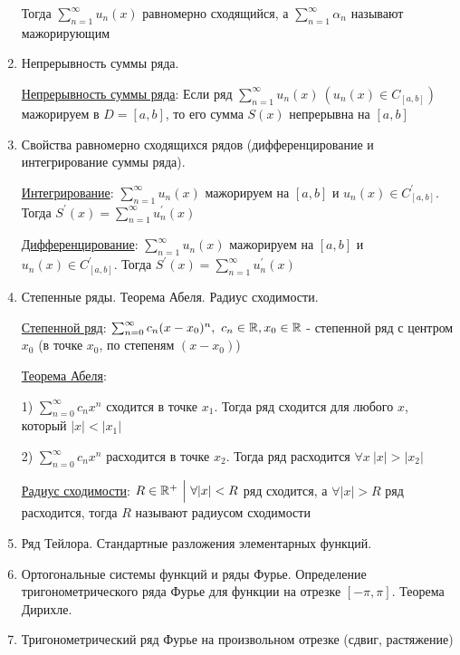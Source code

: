 \documentclass[12pt]{article}
\begin{document}
\begin{enumerate}
    Тогда $\sum_{n = 1}^\infty u_n(x)$ равномерно сходящийся, а $\sum_{n = 1}^\infty \alpha_n$ называют мажорирующим

    \item Непрерывность суммы ряда.

    \hyperlink{functionalsumcontinuity}{Непрерывность суммы ряда}: \Ths Если ряд $\sum_{n = 1}^\infty u_n(x) \ (u_n(x) \in C_{[a, b]})$ мажорируем в $D = [a, b]$, то 
    его сумма $S(x)$ непрерывна на $[a, b]$

    \item Свойства равномерно сходящихся рядов (дифференцирование и интегрирование суммы
    ряда).

    \hyperlink{functionalsumintegral}{Интегрирование}: \Ths $\sum_{n = 1}^\infty u_n(x)$ мажорируем на $[a, b]$ и $u_n(x) \in C^\prime_{[a, b]}$.
    Тогда $S^\prime(x) = \sum_{n = 1}^\infty u^\prime_n(x)$

    \hyperlink{functionalsumderivative}{Дифференцирование}: \Ths $\sum_{n = 1}^\infty u_n(x)$ мажорируем на $[a, b]$ и $u_n(x) \in C^\prime_{[a, b]}$.
    Тогда $S^\prime(x) = \sum_{n = 1}^\infty u^\prime_n(x)$

    \item Степенные ряды. Теорема Абеля. Радиус сходимости.

    \hyperlink{powerseries}{Степенной ряд}: $\sum_{n = 0}^\infty c_n(x - x_0)^n, \ c_n \in \mathbb{R}, x_0 \in \mathbb{R}$ - степенной ряд с центром $x_0$ (в точке $x_0$, по степеням $(x - x_0)$)

    \hyperlink{abelstheorem}{Теорема Абеля}:  

    1) $\sum_{n = 0}^\infty c_n x^n$ сходится в точке $x_1$. Тогда ряд сходится для любого $x$, который $|x| < |x_1|$

    2) $\sum_{n = 0}^\infty c_n x^n$ расходится в точке $x_2$. Тогда ряд расходится $\forall x \ |x| > |x_2|$

    \hyperlink{convergenceradius}{Радиус сходимости}: $R \in \mathbb{R}^+ \ \Big| \ \forall |x| < R $ ряд сходится, а $\forall |x| > R$ ряд расходится, тогда $R$ называют радиусом сходимости

    \item Ряд Тейлора. Стандартные разложения элементарных функций.
    \item Ортогональные системы функций и ряды Фурье. Определение тригонометрического ряда
    Фурье для функции на отрезке $[-\pi, \pi]$. Теорема Дирихле.
    \item Тригонометрический ряд Фурье на произвольном отрезке (сдвиг, растяжение)
\end{enumerate}
\end{document}
